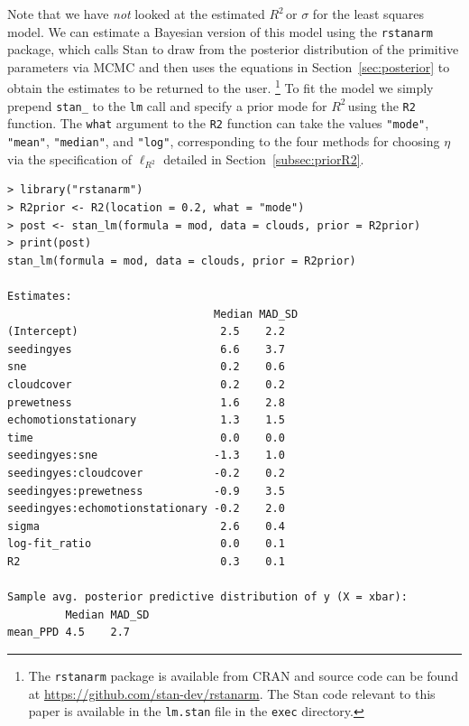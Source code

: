 \documentclass[11pt]{article}
\newcommand{\Rsq}{$R^2\,$}
\newcommand{\locRsq}{\ell_{R^2}}
\begin{document}
Note that we have \emph{not} looked at the estimated \Rsq or $\sigma$ for the
least squares model. We can estimate a Bayesian version of this model using the
{\tt rstanarm} package, which calls Stan \cite{stan} to draw from the posterior
distribution of the primitive parameters via MCMC and then uses the equations in
Section~\ref{sec:posterior} to obtain the estimates to be returned to the user.%
\footnote{The {\tt rstanarm} package is available from CRAN and source code can
be found at \url{https://github.com/stan-dev/rstanarm}. The Stan code relevant
to this paper is available in the {\tt lm.stan} file in the {\tt exec} directory.}
To fit the model we simply prepend {\tt stan\_} to the {\tt lm} call and specify
a prior mode for \Rsq using the {\tt R2} function. The {\tt what} argument to
the {\tt R2} function can take the values {\tt "mode"}, {\tt "mean"},
{\tt "median"}, and {\tt "log"}, corresponding to the four methods for
choosing $\eta$ via the specification of $\locRsq$ detailed in
Section~\ref{subsec:priorR2}.

\vspace{.5cm}
\begin{lstlisting}[frame=lines]
> library("rstanarm")
> R2prior <- R2(location = 0.2, what = "mode")
> post <- stan_lm(formula = mod, data = clouds, prior = R2prior)
> print(post)
stan_lm(formula = mod, data = clouds, prior = R2prior)

Estimates:
                                Median MAD_SD
(Intercept)                      2.5    2.2
seedingyes                       6.6    3.7
sne                              0.2    0.6
cloudcover                       0.2    0.2
prewetness                       1.6    2.8
echomotionstationary             1.3    1.5
time                             0.0    0.0
seedingyes:sne                  -1.3    1.0
seedingyes:cloudcover           -0.2    0.2
seedingyes:prewetness           -0.9    3.5
seedingyes:echomotionstationary -0.2    2.0
sigma                            2.6    0.4
log-fit_ratio                    0.0    0.1
R2                               0.3    0.1

Sample avg. posterior predictive distribution of y (X = xbar):
         Median MAD_SD
mean_PPD 4.5    2.7
\end{lstlisting}
\vspace{.5cm}
\end{document}
